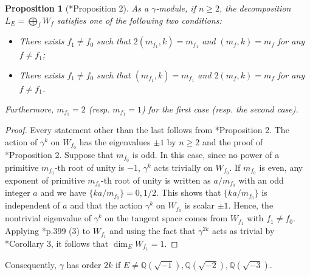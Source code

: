 \documentclass[11pt]{amsart}
\theoremstyle{plain}
\newtheorem{prop}[thm]{Proposition}
\theoremstyle{definition}
\numberwithin{equation}{section}
\def\dim{\mathop{\mathrm{dim}}\nolimits}
\newcommand{\bbQ}{\mathbb{Q}}
\begin{document}
\begin{prop}[{\cite{behrens2012singularities}*{Proposition 2}}]\label{prop_ball_q-ref}
    As a $\gamma$-module, if $n\geq2$, the decomposition $L_E=\bigoplus_f W_f$ satisfies one of the following two conditions:
    \begin{itemize}
        \item There exists $f_1 \neq f_0$ such that $2(m_{f_1}, k) = m_{f_1}$ and $(m_f, k) = m_f$ for any $f \neq f_1$;
        \item There exists $f_1 \neq f_0$ such that $(m_{f_1}, k) = m_{f_1}$ and $2(m_f, k) = m_f$ for any $f \neq f_1$.
    \end{itemize}
    Furthermore, $m_{f_1} = 2$ (resp. $m_{f_1} = 1$) for the first case (resp. the second case).
\end{prop}
\begin{proof}   
    Every statement other than the last follows from \cite{behrens2012singularities}*{Proposition 2}.
    The action of $\gamma^k$ on $W_{f_0}$ has the eigenvalues $\pm 1$ by $n \geq 2$ and the proof of \cite{behrens2012singularities}*{Proposition 2}.
    Suppose that $m_{f_0}$ is odd.
        In this case, since no power of a primitive $m_{f_0}$-th root of unity is $-1$, $\gamma^k$ acts trivially on $W_{f_0}$.
    If $m_{f_0}$ is even, any exponent of primitive $m_{f_0}$-th root of unity is written as $a/m_{f_0}$ with an odd integer $a$ and we have $\{ka/m_{f_0}\} = 0,1/2$.
    This shows that $\{ka/m_{f_0}\}$ is independent of $a$ and that the action $\gamma^k$ on $W_{f_0}$ is scalar $\pm 1$.
    Hence, the nontrivial eigenvalue of $\gamma^k$ on the tangent space comes from $W_{f_1}$ with $f_1 \neq f_0$.
        Applying \cite{behrens2012singularities}*{p.399 (3)} to $W_{f_1}$ and using the fact that $\gamma^{2k}$ acts as trivial by \cite{behrens2012singularities}*{Corollary 3}, it follows that $\dim_EW_{f_1}=1$.
\end{proof}

Consequently, $\gamma$ has order $2k$ if $E\neq\bbQ(\sqrt{-1}),\bbQ(\sqrt{-2}),\bbQ(\sqrt{-3})$.
\end{document}
